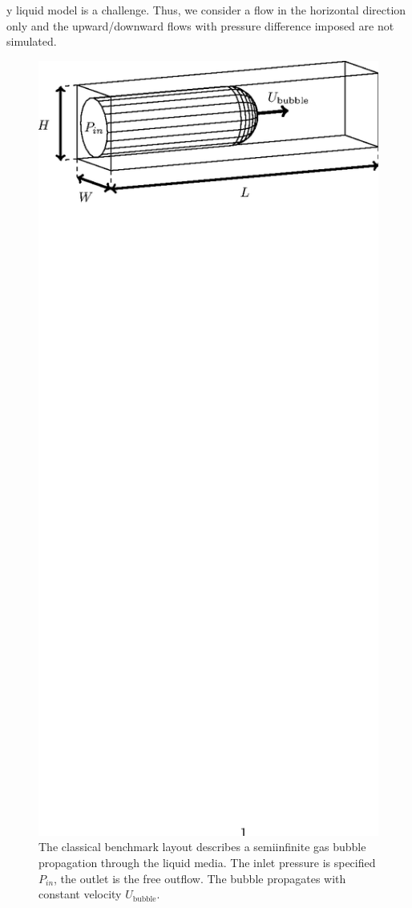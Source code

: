 \documentclass[preprint,12pt]{elsarticle}
\begin{document}
y liquid model is a challenge. Thus, we consider a flow in the
horizontal direction only and the upward/downward flows with pressure difference imposed are not
simulated. 
\begin{figure}[htb!]
\includegraphics*[bb=153 610 410 717,width=\textwidth]{Figures/benchmark_classical.eps} 
\caption{The classical benchmark layout describes a semiinfinite gas bubble
propagation through the liquid media. The inlet pressure is specified $P_{in}$, the outlet is the
free outflow. The bubble propagates with constant velocity $U_{\mathrm{bubble}}$. 
\label{fig:classical:benchmark}}
\end{figure}
\end{document}
